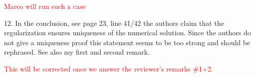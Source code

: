 \documentclass{article}
\newcommand{\tcr}[1]{\textcolor{red}{#1}}
\begin{document}
\tcr{Marco will run such a case}
\bigskip


{\color{blue}
12. In the conclusion, see page 23, line 41/42 the authors claim that the regularization
ensures uniqueness of the numerical solution. Since the authors do not give a 
uniqueness proof this statement seems to be too strong and should be rephrased. See also
my first and second remark.}

\tcr{This will be corrected once we answer the reviewer's remarks \#1+2.}
\bigskip


{\color{blue}
}

\bigskip


{\color{blue}
}

\bigskip
\end{document}
